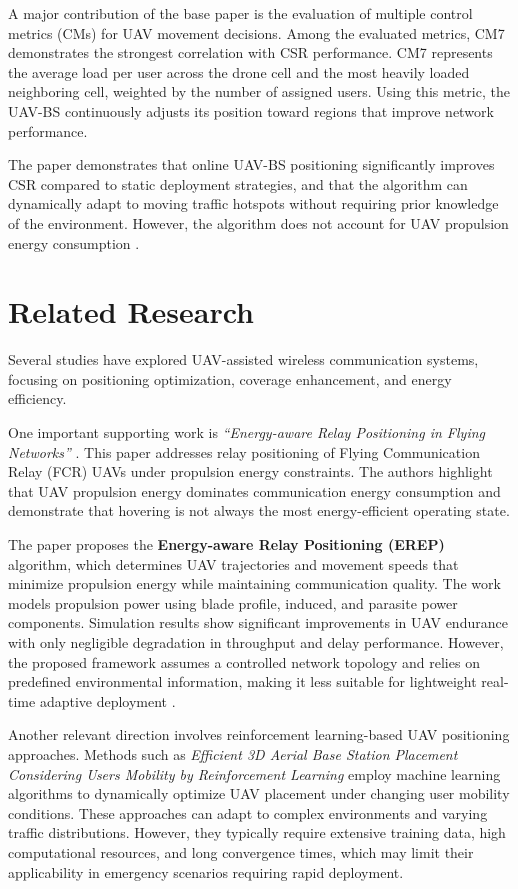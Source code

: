 \documentclass[12pt]{report}
\begin{document}
A major contribution of the base paper is the evaluation of multiple control metrics (CMs) for UAV movement decisions. Among the evaluated metrics, CM7 demonstrates the strongest correlation with CSR performance. CM7 represents the average load per user across the drone cell and the most heavily loaded neighboring cell, weighted by the number of assigned users. Using this metric, the UAV-BS continuously adjusts its position toward regions that improve network performance.

The paper demonstrates that online UAV-BS positioning significantly improves CSR compared to static deployment strategies, and that the algorithm can dynamically adapt to moving traffic hotspots without requiring prior knowledge of the environment. However, the algorithm does not account for UAV propulsion energy consumption \cite{pijnappel2024online}.
\section{Related Research}

Several studies have explored UAV-assisted wireless communication systems, focusing on positioning optimization, coverage enhancement, and energy efficiency.

One important supporting work is \textit{``Energy-aware Relay Positioning in Flying Networks''} \cite{erep2020}. This paper addresses relay positioning of Flying Communication Relay (FCR) UAVs under propulsion energy constraints. The authors highlight that UAV propulsion energy dominates communication energy consumption and demonstrate that hovering is not always the most energy-efficient operating state.

The paper proposes the \textbf{Energy-aware Relay Positioning (EREP)} algorithm, which determines UAV trajectories and movement speeds that minimize propulsion energy while maintaining communication quality. The work models propulsion power using blade profile, induced, and parasite power components. Simulation results show significant improvements in UAV endurance with only negligible degradation in throughput and delay performance. However, the proposed framework assumes a controlled network topology and relies on predefined environmental information, making it less suitable for lightweight real-time adaptive deployment \cite{erep2020}.

Another relevant direction involves reinforcement learning-based UAV positioning approaches. Methods such as \textit{Efficient 3D Aerial Base Station Placement Considering Users Mobility by Reinforcement Learning} \cite{rl_placement} employ machine learning algorithms to dynamically optimize UAV placement under changing user mobility conditions. These approaches can adapt to complex environments and varying traffic distributions. However, they typically require extensive training data, high computational resources, and long convergence times, which may limit their applicability in emergency scenarios requiring rapid deployment.
\end{document}
